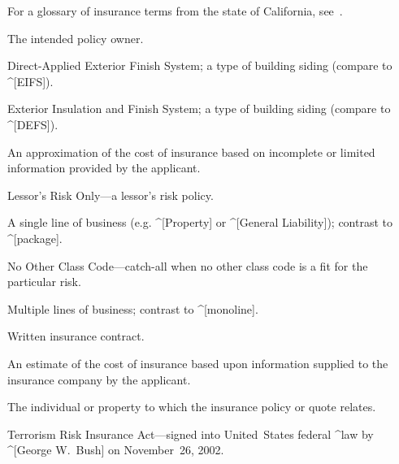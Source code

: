 %
%


For a glossary of insurance terms from the state of California,
see~\cite{gls-ins-calif}.

\begin{description}
  The intended policy owner.

  Direct-Applied Exterior Finish System; a type of building siding (compare to
  ^[EIFS]).

  Exterior Insulation and Finish System; a type of building siding (compare to
  ^[DEFS]).

  An approximation of the cost of insurance based on incomplete or limited
  information provided by the applicant.

  Lessor's Risk Only---a lessor's risk policy.

  A single line of business (e.g. ^[Property] or ^[General Liability]); contrast
  to ^[package].

  No Other Class Code---catch-all when no other class code is a fit for the
  particular risk.

  Multiple lines of business; contrast to ^[monoline].

  Written insurance contract.

  An estimate of the cost of insurance based upon information supplied to the
  insurance company by the applicant.

  The individual or property to which the insurance policy or quote relates.

  Terrorism Risk Insurance Act---signed into United~States federal ^law by
  ^[George W.~Bush] on November~26, 2002.
\end{description}

\enddeptgroup
